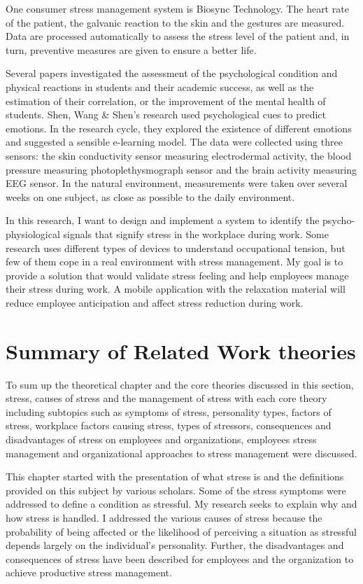 One consumer stress management system is Biosync Technology. The heart rate of the patient, the galvanic reaction to the skin and the gestures are measured. Data are processed automatically to assess the stress level of the patient and, in turn, preventive measures are given to ensure a better life\citep{Nishida2017BioSync:Experience}.

Several papers investigated the assessment of the psychological condition and physical reactions in students\citep{Santos-Gago2019InnovativeReview} and their academic success, as well as the estimation of their correlation, or the improvement of the mental health of students. Shen, Wang \& Shen's research \citep{article} used psychological cues to predict emotions.  In the research cycle, they explored the existence of different emotions and suggested a sensible e-learning model. The data were collected using three sensors: the skin conductivity sensor measuring electrodermal activity, the blood pressure measuring photoplethysmograph sensor and the brain activity measuring EEG sensor. In the natural environment, measurements were taken over several weeks on one subject, as close as possible to the daily environment.

In this research, I want to design and implement a system to identify the psycho-physiological signals that signify stress in the workplace during work. Some research uses different types of devices to understand occupational tension, but few of them cope in a real environment with stress management. My goal is to provide a solution that would validate stress feeling and help employees manage their stress during work.
A mobile application with the relaxation material will reduce employee anticipation and affect stress reduction during work.
\section{Summary of Related Work theories}
To sum up the theoretical chapter and the core theories discussed in this section, stress, causes of stress and the management of stress with each core theory including subtopics such as symptoms of stress, personality types, factors of stress, workplace factors causing stress, types of stressors, consequences and disadvantages of stress on employees and organizations, employees stress management and organizational approaches to stress management were discussed.

This chapter started with the presentation of what stress is and the definitions provided on this subject by various scholars.  Some of the stress symptoms were addressed to define a condition as stressful. My research seeks to explain why and how stress is handled. I addressed the various causes of stress because the probability of being affected or the likelihood of perceiving a situation as stressful depends largely on the individual's personality. Further, the disadvantages and consequences of stress have been described for employees and the organization to achieve productive stress management.

